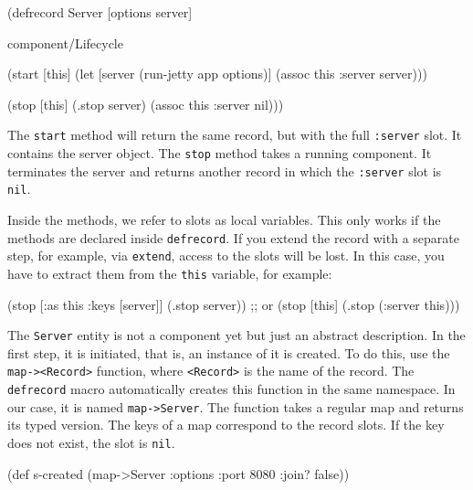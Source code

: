 \else

\begin{english}
  \begin{clojure}
(defrecord Server [options server]

  component/Lifecycle

  (start [this]
    (let [server (run-jetty app options)]
      (assoc this :server server)))

  (stop [this]
    (.stop server)
    (assoc this :server nil)))
  \end{clojure}
\end{english}
\fi

The \verb|start| method will return the same record, but with the full \verb|:server| slot. It contains the server object. The \verb|stop| method takes a running component. It terminates the server and returns another record in which the \verb|:server| slot is \verb|nil|.


Inside the methods, we refer to slots as local variables. This only works if the methods are declared inside \verb|defrecord|. If you extend the record with a separate step, for example, via \verb|extend|, access to the slots will be lost. In this case, you have to extract them from the \verb|this| variable, for example:

\begin{english}
  \begin{clojure}
(stop [{:as this :keys [server]}]
  (.stop server))
;; or
(stop [this]
  (.stop (:server this)))
  \end{clojure}
\end{english}

The \verb|Server| entity is not a component yet but just an abstract description. In the first step, it is initiated, that is, an instance of it is created. To do this, use the \verb|map-><Record>| function, where \verb|<Record>| is the name of the record. The \verb|defrecord| macro automatically creates this function in the same namespace. In our case, it is named \verb|map->Server|. The function takes a regular map and returns its typed version. The keys of a map correspond to the record slots. If the key does not exist, the slot is \verb|nil|.

\ifnarrow

\begin{english}
  \begin{clojure}
(def s-created
  (map->Server
    {:options {:port 8080
               :join? false}}))
  \end{clojure}
\end{english}

